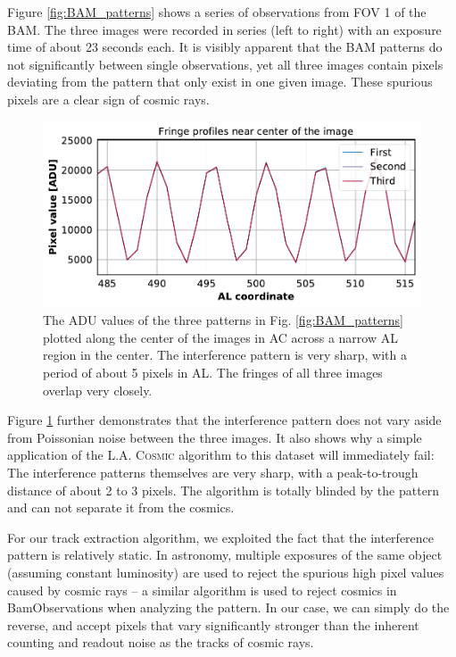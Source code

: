 \documentclass[a4paper, 11pt]{article}
\begin{document}
Figure \ref{fig:BAM_patterns} shows a series of observations from FOV 1 of the BAM. The three images were recorded in series (left to right) with an exposure time of about 23 seconds each. It is visibly apparent that the BAM patterns do not significantly between single observations, yet all three images contain pixels deviating from the pattern that only exist in one given image. These spurious pixels are a clear sign of cosmic rays.

\begin{figure}
  \centering
  \includegraphics[width=\textwidth]{images/extraction/BAM-OBS_fringes}
  \caption{The ADU values of the three patterns in Fig. \ref{fig:BAM_patterns} plotted along the center of the images in AC across a narrow AL region in the center. The interference pattern is very sharp, with a period of about 5 pixels in AL. The fringes of all three images overlap very closely.}
  \label{fig:BAM_fringes}
\end{figure}

Figure \ref{fig:BAM_fringes} further demonstrates that the interference pattern does not vary aside from Poissonian noise between the three images. It also shows why a simple application of the \textsc{L.A. Cosmic} algorithm to this dataset will immediately fail: The interference patterns themselves are very sharp, with a peak-to-trough distance of about 2 to 3 pixels. The algorithm is totally blinded by the pattern and can not separate it from the cosmics.

For our track extraction algorithm, we exploited the fact that the interference pattern is relatively static. In astronomy, multiple exposures of the same object (assuming constant luminosity) are used to reject the spurious high pixel values caused by cosmic rays -- a similar algorithm is used to reject cosmics in BamObservations when analyzing the pattern. In our case, we can simply do the reverse, and accept pixels that vary significantly stronger than the inherent counting and readout noise as the tracks of cosmic rays.
\end{document}
